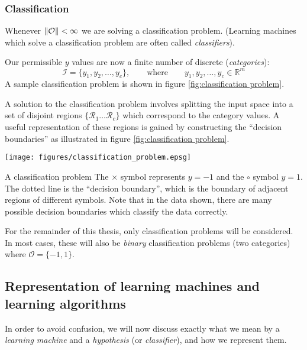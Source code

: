 \subsubsection{Classification}
\label{sec:classification}

Whenever $\|\mathcal{O}\| < \infty$ we are solving a classification
problem.  (Learning machines which solve a classification problem are
often called \emph{classifiers}).

Our permissible $y$ values are now a finite number of discrete
(\emph{categories}):
%
\begin{equation}
\mathcal{I} = \{y_1, y_2, \ldots, y_c\}, \qquad \mbox{where} \qquad y_1, y_2,
\ldots, y_c \in \mathbb{R}^m
\end{equation}
%
A sample classification problem is shown in
figure \ref{fig:classification problem}.

A solution to the classification problem involves splitting the input space
into a set of disjoint regions $\{ \mathcal{R}_1 \ldots \mathcal{R}_c
\}$ which correspond to the category values.  A useful representation
of these regions is gained by constructing the ``decision boundaries''
as illustrated in figure \ref{fig:classification problem}.

\begin{linefigure}
\begin{center}
\texttt{[image: figures/classification\_problem.epsg]}
\end{center}
\begin{capt}{A classification problem}
The $\times$ symbol represents $y=-1$ and the $\circ$ symbol $y=1$.
The dotted line is the ``decision boundary'', which is the boundary of
adjacent regions of different symbols.  Note that in the data shown,
there are many possible decision boundaries which classify the data
correctly.
\end{capt}
\label{fig:classification problem}
\end{linefigure}

For the remainder of this thesis, only classification problems will be
considered.  In most cases, these will also be \emph{binary}
classification problems (two categories) where $\mathcal{O} = \{-1,
1\}$.


\subsection{Representation of learning machines and learning
algorithms}

In order to avoid confusion, we will now discuss exactly what we mean
by a \emph{learning machine} and a \emph{hypothesis} (or
\emph{classifier}), and how we represent them.


